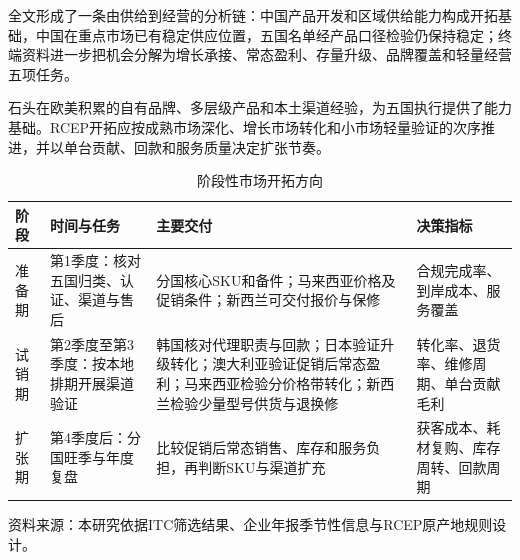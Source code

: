 \documentclass[UTF8,a4paper,12pt]{ctexart}
\begin{document}
全文形成了一条由供给到经营的分析链：中国产品开发和区域供给能力构成开拓基础，中国在重点市场已有稳定供应位置，五国名单经产品口径检验仍保持稳定；终端资料进一步把机会分解为增长承接、常态盈利、存量升级、品牌覆盖和轻量经营五项任务。

石头在欧美积累的自有品牌、多层级产品和本土渠道经验，为五国执行提供了能力基础。RCEP开拓应按成熟市场深化、增长市场转化和小市场轻量验证的次序推进，并以单台贡献、回款和服务质量决定扩张节奏。

\begin{table}[H]
\centering
\caption{阶段性市场开拓方向}
\label{tab:roadmap}
\small
\begin{tabular}{p{2.0cm}p{3.6cm}p{5.1cm}p{3.1cm}}
\toprule
阶段 & 时间与任务 & 主要交付 & 决策指标\\
\midrule
准备期 & 第1季度：核对五国归类、认证、渠道与售后 & 分国核心SKU和备件；马来西亚价格及促销条件；新西兰可交付报价与保修 & 合规完成率、到岸成本、服务覆盖\\
试销期 & 第2季度至第3季度：按本地排期开展渠道验证 & 韩国核对代理职责与回款；日本验证升级转化；澳大利亚验证促销后常态盈利；马来西亚检验分价格带转化；新西兰检验少量型号供货与退换修 & 转化率、退货率、维修周期、单台贡献毛利\\
扩张期 & 第4季度后：分国旺季与年度复盘 & 比较促销后常态销售、库存和服务负担，再判断SKU与渠道扩充 & 获客成本、耗材复购、库存周转、回款周期\\
\bottomrule
\end{tabular}
\par\vspace{0.4em}
\begin{minipage}{0.92\textwidth}\small
资料来源：本研究依据ITC筛选结果、企业年报季节性信息与RCEP原产地规则设计。
\end{minipage}
\end{table}


\begingroup
\sloppy
\theendnotes
\endgroup
\end{document}
